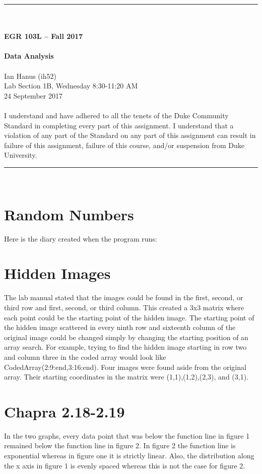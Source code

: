 \documentclass{article}
\begin{document}
\begin{center}
\rule{6.5in}{0.5mm}\\~\\
\textbf{\large EGR 103L -- Fall 2017}\\~\\
\textbf{\huge Data Analysis}\\~\\
Ian Hanus (ih52)\\
Lab Section 1B, Wednesday 8:30-11:20 AM\\
24 September 2017\\~\\
{\small I understand and have adhered to all the tenets of the Duke
  Community Standard in completing every part of this assignment.  I
  understand that a violation of any part of the Standard on any part
  of this assignment can result in failure of this assignment, failure
  of this course, and/or suspension from Duke University.} 
\rule{6.5in}{0.5mm}\\
\end{center}
\tableofcontents
\listoffigures
\pagebreak

\section{Random Numbers}
Here is the diary created when the program runs:

\section{Hidden Images}
The lab manual stated that the images could be found in the first, second, or third row and first, second, or third column. This created a 3x3 matrix where each point could be the starting point of the hidden image. The starting point of the hidden image scattered in every ninth row and sixteenth column of the original image could be changed simply by changing the starting position of an array search. For example, trying to find the hidden image starting in row two and column three in the coded array would look like CodedArray(2:9:end,3:16:end). Four images were found aside from the original array. Their starting coordinates in the matrix were (1,1),(1,2),(2,3), and (3,1).

\section{Chapra 2.18-2.19}
In the two graphs, every data point that was below the function line in figure 1 remained below the function line in figure 2. In figure 2 the function line is exponential whereas in figure one it is strictly linear. Also, the distribution along the x axis in figure 1 is evenly spaced whereas this is not the case for figure 2.
\end{document}
